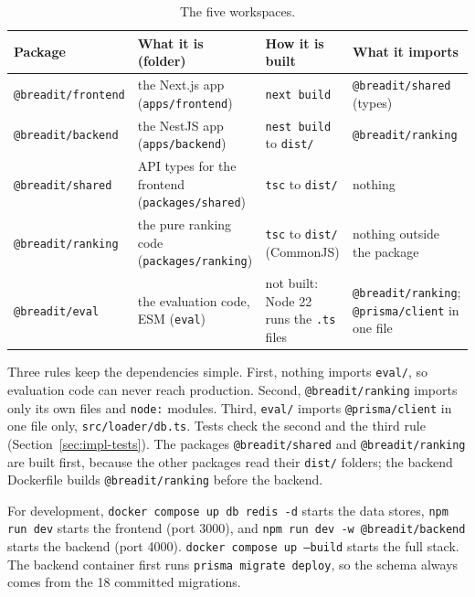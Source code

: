 \begin{table}[htb]
  \centering
  \caption{The five workspaces.}
  \label{tab:impl-workspaces}
  \footnotesize
  \renewcommand{\arraystretch}{1.15}
  \begin{tabularx}{\textwidth}{@{}>{\raggedright\arraybackslash}p{3.4cm} >{\raggedright\arraybackslash}X >{\raggedright\arraybackslash}p{3.0cm} >{\raggedright\arraybackslash}p{3.1cm}@{}}
    \toprule
    Package & What it is (folder) & How it is built & What it imports \\
    \midrule
    \texttt{@breadit/frontend} & the Next.js app (\texttt{apps/frontend}) & \texttt{next build} & \texttt{@breadit/shared} (types) \\
    \texttt{@breadit/backend}  & the NestJS app (\texttt{apps/backend}) & \texttt{nest build} to \texttt{dist/} & \texttt{@breadit/ranking} \\
    \texttt{@breadit/shared}   & API types for the frontend (\texttt{packages/shared}) & \texttt{tsc} to \texttt{dist/} & nothing \\
    \texttt{@breadit/ranking}  & the pure ranking code (\texttt{packages/ranking}) & \texttt{tsc} to \texttt{dist/} (CommonJS) & nothing outside the package \\
    \texttt{@breadit/eval}     & the evaluation code, ESM (\texttt{eval}) & not built: Node 22 runs the \texttt{.ts} files & \texttt{@breadit/ranking}; \texttt{@prisma/client} in one file \\
    \bottomrule
  \end{tabularx}
\end{table}

Three rules keep the dependencies simple. First, nothing imports \texttt{eval/}, so evaluation code can never reach production. Second, \texttt{@breadit/ranking} imports only its own files and \texttt{node:} modules. Third, \texttt{eval/} imports \texttt{@prisma/client} in one file only, \texttt{src/loader/db.ts}. Tests check the second and the third rule (Section~\ref{sec:impl-tests}). The packages \texttt{@breadit/shared} and \texttt{@breadit/ranking} are built first, because the other packages read their \texttt{dist/} folders; the backend Dockerfile builds \texttt{@breadit/ranking} before the backend.

For development, \texttt{docker compose up db redis -d} starts the data stores, \texttt{npm run dev} starts the frontend (port 3000), and \texttt{npm run dev -w @breadit/backend} starts the backend (port 4000). \texttt{docker compose up --build} starts the full stack. The backend container first runs \texttt{prisma migrate deploy}, so the schema always comes from the 18 committed migrations.

